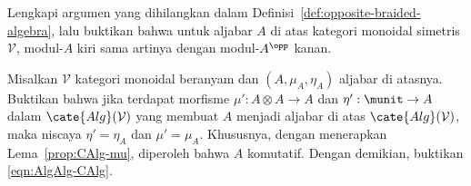 
\begin{Exercises}
	\item Lengkapi argumen yang dihilangkan dalam
	Definisi~\ref{def:opposite-braided-algebra}, lalu buktikan bahwa untuk
	aljabar $A$ di atas kategori monoidal simetris $\mathcal{V}$, modul-$A$
	kiri sama artinya dengan modul-$A^{\opp}$ kanan.

	\item Misalkan $\mathcal{V}$ kategori monoidal beranyam dan
	$(A,\mu_A,\eta_A)$ aljabar di atasnya. Buktikan bahwa jika terdapat
	morfisme $\mu':A\otimes A\to A$ dan $\eta':\munit\to A$ dalam
	$\cate{Alg}(\mathcal{V})$ yang membuat $A$ menjadi aljabar di atas
	$\cate{Alg}(\mathcal{V})$, maka niscaya $\eta'=\eta_A$ dan
	$\mu'=\mu_A$. Khususnya, dengan menerapkan
	Lema~\ref{prop:CAlg-mu}, diperoleh bahwa $A$ komutatif. Dengan demikian,
	buktikan \eqref{eqn:AlgAlg-CAlg}.


\end{Exercises}
